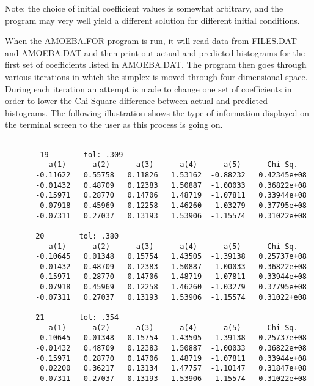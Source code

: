       Note:  the choice of initial coefficient values is somewhat
          arbitrary, and the program may very well yield a different
          solution for different initial conditions.

      When the AMOEBA.FOR program is run, it will read data from FILES.DAT
   and AMOEBA.DAT and then print out actual and predicted histograms for
   the first set of coefficients listed in AMOEBA.DAT.  The program then
   goes through various iterations in which the simplex is moved through
   four dimensional space.  During each iteration an attempt is made to
   change one set of coefficients in order to lower the Chi Square
   difference between actual and predicted histograms.  The following
   illustration shows the type of information displayed on the terminal
   screen to the user as this process is going on.
\begin{center}
\begin{verbatim}

        19        tol: .309
          a(1)      a(2)      a(3)      a(4)      a(5)      Chi Sq.
       -0.11622   0.55758   0.11826   1.53162  -0.88232   0.42345e+08
       -0.01432   0.48709   0.12383   1.50887  -1.00033   0.36822e+08
       -0.15971   0.28770   0.14706   1.48719  -1.07811   0.33944e+08
        0.07918   0.45969   0.12258   1.46260  -1.03279   0.37795e+08
       -0.07311   0.27037   0.13193   1.53906  -1.15574   0.31022e+08

       20        tol: .380
          a(1)      a(2)      a(3)      a(4)      a(5)      Chi Sq.
       -0.10645   0.01348   0.15754   1.43505  -1.39138   0.25737e+08
       -0.01432   0.48709   0.12383   1.50887  -1.00033   0.36822e+08
       -0.15971   0.28770   0.14706   1.48719  -1.07811   0.33944e+08
        0.07918   0.45969   0.12258   1.46260  -1.03279   0.37795e+08
       -0.07311   0.27037   0.13193   1.53906  -1.15574   0.31022+e08

       21        tol: .354
          a(1)      a(2)      a(3)      a(4)      a(5)      Chi Sq.
        0.10645   0.01348   0.15754   1.43505  -1.39138   0.25737e+08
       -0.01432   0.48709   0.12383   1.50887  -1.00033   0.36822e+08
       -0.15971   0.28770   0.14706   1.48719  -1.07811   0.33944e+08
        0.02200   0.36217   0.13134   1.47757  -1.10147   0.31847e+08
       -0.07311   0.27037   0.13193   1.53906  -1.15574   0.31022e+08

\end{verbatim}
\end{center}

